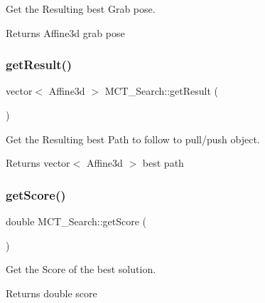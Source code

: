Get the Resulting best Grab pose. 

\begin{DoxyReturn}{Returns}
Affine3d grab pose 
\end{DoxyReturn}
\mbox{\label{classMCT__Search_ab28fe87c4254e464ab8cfce14ffc665e}} 
\subsubsection{\texorpdfstring{get\+Result()}{getResult()}}
{\footnotesize\ttfamily vector$<$ Affine3d $>$ M\+C\+T\+\_\+\+Search\+::get\+Result (\begin{DoxyParamCaption}{ }\end{DoxyParamCaption})\hspace{0.3cm}{\ttfamily [inline]}}



Get the Resulting best Path to follow to pull/push object. 

\begin{DoxyReturn}{Returns}
vector$<$ Affine3d $>$ best path 
\end{DoxyReturn}
\mbox{\label{classMCT__Search_aa7029de4d31d20f106ce215affca20e0}} 
\subsubsection{\texorpdfstring{get\+Score()}{getScore()}}
{\footnotesize\ttfamily double M\+C\+T\+\_\+\+Search\+::get\+Score (\begin{DoxyParamCaption}{ }\end{DoxyParamCaption})\hspace{0.3cm}{\ttfamily [inline]}}



Get the Score of the best solution. 

\begin{DoxyReturn}{Returns}
double score 
\end{DoxyReturn}
\mbox{\label{classMCT__Search_a616c197a5427596143c0512a40373e8d}} 
